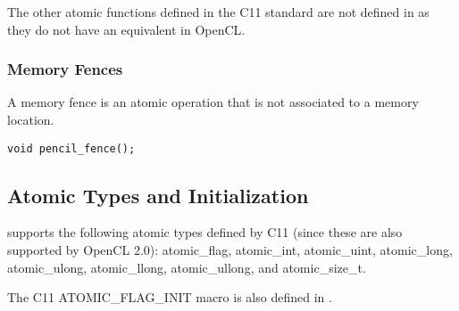 The other atomic functions defined in the  C11 standard are not defined in
\pencil as they do not have an equivalent in OpenCL.

\subsubsection{Memory Fences}
A memory fence is an atomic operation that is not associated to a memory
location.

\lstinline!void pencil_fence();!


\subsection{Atomic Types and Initialization}
\pencil supports the following atomic types defined by C11 (since these are
also supported by OpenCL 2.0):
atomic_flag, atomic_int, atomic_uint, atomic_long, atomic_ulong, atomic_llong,
atomic_ullong, and atomic_size_t.

The C11 ATOMIC_FLAG_INIT macro is also defined in \pencil.


